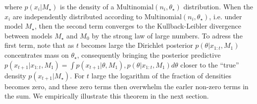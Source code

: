 \documentclass[11pt]{article}
\begin{document}
where  $p(x_i|M_\star)$ is the density of a $\text{Multinomial}(n_i,\theta_{\star})$ distribution.
When the $x_i$ are independently distributed according to $\text{Multinomial}(n_i, \theta_\star)$, i.e. under model $M_\star$, then the second term converges to the Kullback-Leibler divergence between models $M_\star$ and $M_0$ by the strong law of large numbers. To adress the first term, note that as $t$ becomes large the Dirichlet posterior $p(\theta|x_{1:t}, M_1)$ concentrates mass on $\theta_\star$, consequently bringing the posterior predictive $p(x_{t+1}|x_{1:t},M_1) =\int p(x_{t+1}|\theta,M_1),p(\theta|x_{1:t},M_1) d\theta$ closer to the ``true'' density $p(x_{t+1}|M_{\star})$. For $t$ large the logarithm of the fraction of densities becomes zero, and these zero terms then overwhelm the earler non-zero terms in the sum. We empirically illustrate this theorem in the next section.
\end{document}

